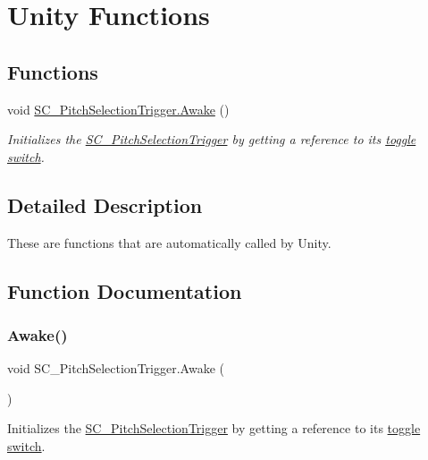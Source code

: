 \hypertarget{group___s_c___p_s_t_unity}{}\section{Unity Functions}
\label{group___s_c___p_s_t_unity}
\subsection*{Functions}
\begin{DoxyCompactItemize}
\item 
void \hyperlink{group___s_c___p_s_t_unity_gafa93dcca78e174eb2de6c4ea83b66a39}{S\+C\+\_\+\+Pitch\+Selection\+Trigger.\+Awake} ()
\begin{DoxyCompactList}\small\item\em Initializes the \hyperlink{class_s_c___pitch_selection_trigger}{S\+C\+\_\+\+Pitch\+Selection\+Trigger} by getting a reference to its \hyperlink{group___s_c___p_s_t_priv_var_ga1ecd33f50c82f6ffda81850438907a31}{toggle switch}. \end{DoxyCompactList}\end{DoxyCompactItemize}


\subsection{Detailed Description}
These are functions that are automatically called by Unity. 

\subsection{Function Documentation}
\mbox{\label{group___s_c___p_s_t_unity_gafa93dcca78e174eb2de6c4ea83b66a39}} 
\subsubsection{\texorpdfstring{Awake()}{Awake()}}
{\footnotesize\ttfamily void S\+C\+\_\+\+Pitch\+Selection\+Trigger.\+Awake (\begin{DoxyParamCaption}{ }\end{DoxyParamCaption})\hspace{0.3cm}{\ttfamily [private]}}



Initializes the \hyperlink{class_s_c___pitch_selection_trigger}{S\+C\+\_\+\+Pitch\+Selection\+Trigger} by getting a reference to its \hyperlink{group___s_c___p_s_t_priv_var_ga1ecd33f50c82f6ffda81850438907a31}{toggle switch}. 



